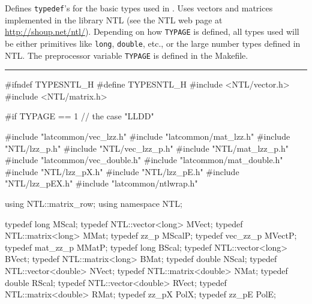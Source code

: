 % 
% 
% 
% 


Defines \texttt{typedef}'s for the basic types used in \latmrg.%
Uses vectors and matrices implemented in the library NTL
(see the NTL web page at \url{http://shoup.net/ntl/}).
Depending on how \texttt{TYPAGE} is defined, all types used will be either
primitives like \texttt{long}, \texttt{double}, etc., or the large number 
types defined in NTL. 
The preprocessor variable \texttt{TYPAGE} is defined in the Makefile.
 \label{mod:TypesNTL} 


\bigskip\hrule
\code\hide
#ifndef TYPESNTL_H
#define TYPESNTL_H
\endhide
#include <NTL/vector.h>
#include <NTL/matrix.h>


#if TYPAGE == 1
// the case  "LLDD"

#include "latcommon/vec_lzz.h"
#include "latcommon/mat_lzz.h"
#include "NTL/lzz_p.h"
#include "NTL/vec_lzz_p.h"
#include "NTL/mat_lzz_p.h"
#include "latcommon/vec_double.h"
#include "latcommon/mat_double.h"
#include "NTL/lzz_pX.h"
#include "NTL/lzz_pE.h"
#include "NTL/lzz_pEX.h"
#include "latcommon/ntlwrap.h"

using NTL::matrix_row;
using namespace NTL;


typedef long              MScal;
typedef NTL::vector<long> MVect;
typedef NTL::matrix<long> MMat;
   typedef zz_p     MScalP;
   typedef vec_zz_p MVectP;
   typedef mat_zz_p MMatP;
typedef long                BScal;
typedef NTL::vector<long> BVect;
typedef NTL::matrix<long> BMat;
typedef double              NScal;
typedef NTL::vector<double> NVect;
typedef NTL::matrix<double> NMat;
typedef double              RScal;
typedef NTL::vector<double> RVect;
typedef NTL::matrix<double> RMat;
   typedef zz_pX    PolX;
   typedef zz_pE    PolE;
\endcode
\newpage
\code


